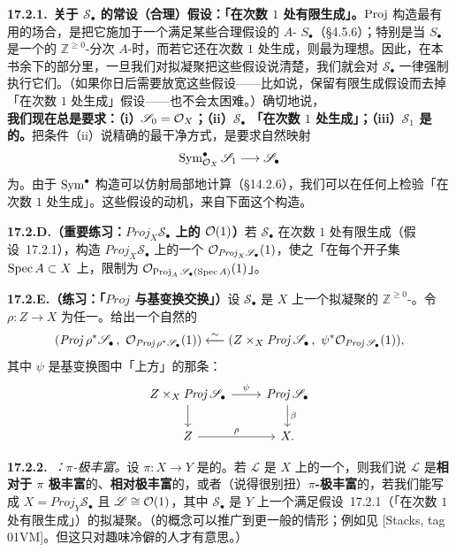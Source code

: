 \textbf{17.2.1.}\ \textbf{关于 $\mathscr{S}_\bullet$ 的常设（合理）假设：「在次数 $1$ 处有限生成」。}\quad $\operatorname{Proj}$ 构造最有用的场合，是把它施加于一个满足某些合理假设的 $A$-\trAlgebra{} $S_\bullet$（\S4.5.6）；特别是当 $S_\bullet$ 是一个\trFinitelyGenerated{}的 $\mathbb{Z}^{\ge0}$-分次 $A$-\trAlgebra{}时，而若它还在次数 $1$ 处生成，则最为理想。因此，在本书余下的部分里，一旦我们对拟凝聚\trSheafOfAlgebras{}把这些假设说清楚，我们就会对 $\mathscr{S}_\bullet$ 一律强制执行它们。（如果你日后需要放宽这些假设——比如说，保留有限生成假设而去掉「在次数 $1$ 处生成」假设——也不会太困难。）确切地说，\textbf{我们现在总是要求：（i）$\mathscr{S}_0=\mathcal{O}_X$；（ii）$\mathscr{S}_\bullet$ 「在次数 $1$ 处生成」；（iii）$\mathscr{S}_1$ 是\trFiniteType{}的。}把条件（ii）说精确的最干净方式，是要求自然映射
\[
\operatorname{Sym}^\bullet_{\mathcal{O}_X}\mathscr{S}_1\longrightarrow\mathscr{S}_\bullet
\]
为\trSurjectiveMap。由于 $\operatorname{Sym}^\bullet$ 构造可以仿射局部地计算（\S14.2.6），我们可以在任何\trAffine\trCover{}上检验「在次数 $1$ 处生成」。这些假设的动机，来自下面这个构造。

\textbf{17.2.D.（重要练习：$\mathit{Proj}_X\mathscr{S}_\bullet$ 上的 $\mathcal{O}(1)$）}\quad 若 $\mathscr{S}_\bullet$ 在次数 $1$ 处有限生成（\mbox{假设~17.2.1}），构造 $\mathit{Proj}_X\mathscr{S}_\bullet$ 上的一个\trInvertibleSheaf{} $\mathcal{O}_{\mathit{Proj}_X\mathscr{S}_\bullet}(1)$，使之「在每个\trAffine{}开子集 $\operatorname{Spec} A\subset X$ 上，限制为 $\mathcal{O}_{\operatorname{Proj}_A\mathscr{S}_\bullet(\operatorname{Spec} A)}(1)$」。

\textbf{17.2.E.（练习：「$\mathit{Proj}$ 与基变换交换」）}\quad 设 $\mathscr{S}_\bullet$ 是 $X$ 上一个拟凝聚的 $\mathbb{Z}^{\ge0}$-\trSheafOfGradedAlgebras。令 $\rho\colon Z\to X$ 为任一\trMorphism。给出一个自然的\trIsomorphism
\[
(\mathit{Proj}\,\rho^*\mathscr{S}_\bullet\,,\ \OO_{\mathit{Proj}\,\rho^*\mathscr{S}_\bullet}(1))\overset{\sim}{\longleftarrow}(Z\times_X\mathit{Proj}\,\mathscr{S}_\bullet\,,\ \psi^*\OO_{\mathit{Proj}\,\mathscr{S}_\bullet}(1)),
\]
其中 $\psi$ 是基变换图中「上方」的那条\trMorphism：
\[
\begin{tikzcd}
Z\times_X\mathit{Proj}\,\mathscr{S}_\bullet \ar[r, "\psi"] \ar[d] & \mathit{Proj}\,\mathscr{S}_\bullet \ar[d, "\beta"] \\
Z \ar[r, "\rho"] & X.
\end{tikzcd}
\]

\textbf{17.2.2.}\ \emph{\trhDefinition：$\pi$-极丰富。}\quad 设 $\pi\colon X\to Y$ 是\trProper{}的。若 $\mathscr{L}$ 是 $X$ 上的一个\trInvertibleSheaf，则我们说 $\mathscr{L}$ 是\textbf{相对于 $\pi$ 极丰富}的、\textbf{相对极丰富}的，或者（说得很别扭）\textbf{$\pi$-极丰富}的，若我们能写成 $X=\mathit{Proj}_Y\mathscr{S}_\bullet$ 且 $\mathscr{L}\cong\mathcal{O}(1)$，其中 $\mathscr{S}_\bullet$ 是 $Y$ 上一个满足\mbox{假设~17.2.1}（「在次数 $1$ 处有限生成」）的拟凝聚\trSheafOfAlgebras。（\trVeryAmpleness{}的概念可以推广到更一般的情形；例如见 [Stacks, tag 01VM]。但这只对趣味冷僻的人才有意思。）

